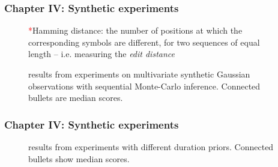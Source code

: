 \documentclass[aspectratio=169]{beamer}
\begin{document}

\begin{frame}
    \frametitle{Chapter IV: Synthetic experiments}
    \begin{figure}[ht!]
        \hfill
        \hfill
        \hfill
        \caption{results from experiments on multivariate synthetic Gaussian observations with sequential Monte-Carlo inference. Connected bullets are median scores.}
        \textcolor{red}{*}\footnotesize{Hamming distance: the number of positions at which the corresponding symbols are different, for two sequences of equal length -- i.e. measuring the \emph{edit distance}}
    \end{figure}
\end{frame}

\begin{frame}
    \frametitle{Chapter IV: Synthetic experiments}
    \begin{figure}[ht!]
        \hfill
        \hfill
        \hfill
        \caption{results from experiments with different duration priors. Connected bullets show median scores.}
    \end{figure}
\end{frame}
\end{document}
